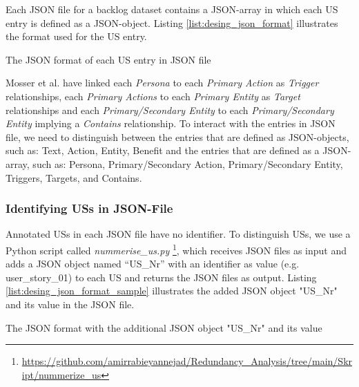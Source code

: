 Each JSON file for a backlog dataset contains a JSON-array in which each US entry is defined as a JSON-object. Listing \ref{list:desing_json_format} illustrates the format used for the US entry.
\begin{MyListing}
	
	\caption{The JSON format of each US entry in JSON file}\label{list:desing_json_format}
	
\end{MyListing}
Mosser et al. have linked each \emph{Persona} to each \emph{Primary Action} as \emph{Trigger} relationships, each \emph{Primary Actions} to each \emph{Primary Entity} as \emph{Target} relationships and each \emph{Primary/Secondary Entity} to each \emph{Primary/Secondary Entity} implying a \emph{Contains} relationship\cite{arulmohan2023extracting}.
To interact with the entries in JSON file, we need to distinguish between the entries that are defined as JSON-objects, such as: {Text, Action, Entity, Benefit} and the entries that are defined as a JSON-array, such as: {Persona, Primary/Secondary Action, Primary/Secondary Entity, Triggers, Targets, and Contains}.
\subsubsection*{Identifying USs in JSON-File}\label{desing_workflow_nummerize_us}
Annotated USs in each JSON file have no identifier. To distinguish USs, we use a Python script called \textit{nummerise\_us.py} \footnote{\href{https://github.com/amirrabieyannejad/Redundancy_Analysis/tree/main/Skript/nummerize_us}{https://github.com/amirrabieyannejad/Redundancy\_Analysis/tree/main/Skript/nummerize\_us}}, which receives JSON files as input and adds a JSON object named \enquote{US\_Nr} with an identifier as value (e.g. user\_story\_01) to each US and returns the JSON files as output.
Listing \ref{list:desing_json_format_sample} illustrates the added JSON object "US\_Nr" and its value in the JSON file.
\begin{MyListing}
	
	\centering
	
	\caption{The JSON format with the additional JSON object "US\_Nr" and its value}\label{list:desing_json_format_sample}
\end{MyListing}
